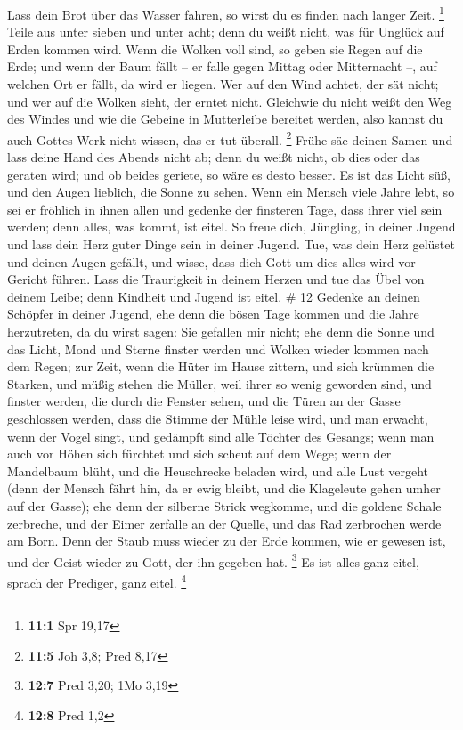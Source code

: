  Lass dein Brot über das Wasser fahren, so wirst du es
finden nach langer Zeit. \footnote{\textbf{11:1} Spr 19,17}
 Teile aus unter sieben und unter acht; denn du weißt
nicht, was für Unglück auf Erden kommen wird.  Wenn die
Wolken voll sind, so geben sie Regen auf die Erde; und wenn der Baum
fällt -- er falle gegen Mittag oder Mitternacht --, auf welchen Ort er
fällt, da wird er liegen.  Wer auf den Wind achtet, der
sät nicht; und wer auf die Wolken sieht, der erntet nicht.
 Gleichwie du nicht weißt den Weg des Windes und wie die
Gebeine in Mutterleibe bereitet werden, also kannst du auch Gottes Werk
nicht wissen, das er tut überall. \footnote{\textbf{11:5} Joh 3,8; Pred
  8,17}  Frühe säe deinen Samen und lass deine Hand des
Abends nicht ab; denn du weißt nicht, ob dies oder das geraten wird; und
ob beides geriete, so wäre es desto besser.  Es ist das
Licht süß, und den Augen lieblich, die Sonne zu sehen. 
Wenn ein Mensch viele Jahre lebt, so sei er fröhlich in ihnen allen und
gedenke der finsteren Tage, dass ihrer viel sein werden; denn alles, was
kommt, ist eitel.  So freue dich, Jüngling, in deiner
Jugend und lass dein Herz guter Dinge sein in deiner Jugend. Tue, was
dein Herz gelüstet und deinen Augen gefällt, und wisse, dass dich Gott
um dies alles wird vor Gericht führen.  Lass die
Traurigkeit in deinem Herzen und tue das Übel von deinem Leibe; denn
Kindheit und Jugend ist eitel. \# 12  Gedenke an deinen
Schöpfer in deiner Jugend, ehe denn die bösen Tage kommen und die Jahre
herzutreten, da du wirst sagen: Sie gefallen mir nicht; 
ehe denn die Sonne und das Licht, Mond und Sterne finster werden und
Wolken wieder kommen nach dem Regen;  zur Zeit, wenn die
Hüter im Hause zittern, und sich krümmen die Starken, und müßig stehen
die Müller, weil ihrer so wenig geworden sind, und finster werden, die
durch die Fenster sehen,  und die Türen an der Gasse
geschlossen werden, dass die Stimme der Mühle leise wird, und man
erwacht, wenn der Vogel singt, und gedämpft sind alle Töchter des
Gesangs;  wenn man auch vor Höhen sich fürchtet und sich
scheut auf dem Wege; wenn der Mandelbaum blüht, und die Heuschrecke
beladen wird, und alle Lust vergeht (denn der Mensch fährt hin, da er
ewig bleibt, und die Klageleute gehen umher auf der Gasse);
 ehe denn der silberne Strick wegkomme, und die goldene
Schale zerbreche, und der Eimer zerfalle an der Quelle, und das Rad
zerbrochen werde am Born.  Denn der Staub muss wieder zu
der Erde kommen, wie er gewesen ist, und der Geist wieder zu Gott, der
ihn gegeben hat. \footnote{\textbf{12:7} Pred 3,20; 1Mo 3,19}
 Es ist alles ganz eitel, sprach der Prediger, ganz eitel.
\footnote{\textbf{12:8} Pred 1,2}

